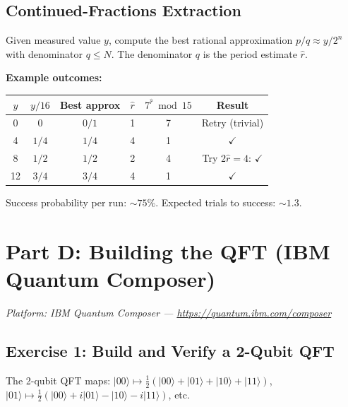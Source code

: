 \documentclass[a4paper,11pt]{article}
\newcommand{\crd}[1]{\textcolor{ibmred}{#1}}
\providecommand{\ket}[1]{|#1\rangle}
\begin{document}
\subsection{Continued-Fractions Extraction}

\begin{defbox}
Given measured value $y$, compute the best rational approximation
$p/q \approx y/2^n$ with denominator $q \leq N$.
The denominator $q$ is the period estimate $\hat{r}$.
\end{defbox}

\noindent\textbf{Example outcomes:}
\begin{center}
\begin{tabular}{cccccc}
    \hline
    $y$ & $y/16$ & Best approx & $\hat{r}$ &
    $7^{\hat{r}} \bmod 15$ & Result \\ \hline
    0  & $0$    & $0/1$  & 1 & 7 & Retry (trivial) \\
    4  & $1/4$  & $1/4$  & \crd{4} & 1 & $\checkmark$ \\
    8  & $1/2$  & $1/2$  & 2 & 4 & Try $2\hat{r} = 4$: $\checkmark$ \\
    12 & $3/4$  & $3/4$  & \crd{4} & 1 & $\checkmark$ \\
    \hline
\end{tabular}
\end{center}
Success probability per run: $\sim\!75\%$. Expected trials to success: $\sim\!1.3$.

\section{Part D: Building the QFT (IBM Quantum Composer)}

\textit{Platform: IBM Quantum Composer — \url{https://quantum.ibm.com/composer}}

\subsection{Exercise 1: Build and Verify a 2-Qubit QFT}

The 2-qubit QFT maps:
$\ket{00} \mapsto \frac{1}{2}(\ket{00}+\ket{01}+\ket{10}+\ket{11})$,
$\ket{01} \mapsto \frac{1}{2}(\ket{00}+i\ket{01}-\ket{10}-i\ket{11})$,
etc.
\end{document}
